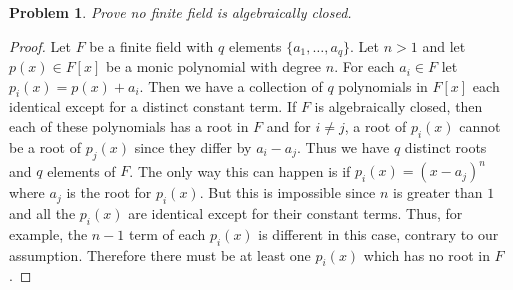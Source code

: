 \documentclass{article}
\newtheorem{problem}{Problem}
\begin{document}

\begin{problem}
Prove no finite field is algebraically closed.
\end{problem}
\begin{proof}
Let $F$ be a finite field with $q$ elements $\{a_1, \dots , a_q\}$. Let $n > 1$ and let $p(x) \in F[x]$ be a monic polynomial with degree $n$. For each $a_i \in F$ let $p_i(x) = p(x) + a_i$. Then we have a collection of $q$ polynomials in $F[x]$ each identical except for a distinct constant term. If $F$ is algebraically closed, then each of these polynomials has a root in $F$ and for $i \neq j$, a root of $p_i(x)$ cannot be a root of $p_j(x)$ since they differ by $a_i-a_j$. Thus we have $q$ distinct roots and $q$ elements of $F$. The only way this can happen is if $p_i(x) = (x-a_j)^n$ where $a_j$ is the root for $p_i(x)$. But this is impossible since $n$ is greater than $1$ and all the $p_i(x)$ are identical except for their constant terms. Thus, for example, the $n-1$ term of each $p_i(x)$ is different in this case, contrary to our assumption. Therefore there must be at least one $p_i(x)$ which has no root in $F$.
\end{proof}
\end{document}
